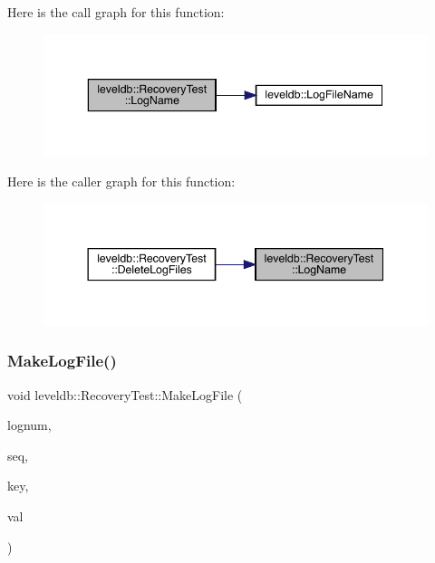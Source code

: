 Here is the call graph for this function\+:
\nopagebreak
\begin{figure}[H]
\begin{center}
\leavevmode
\includegraphics[width=343pt]{classleveldb_1_1_recovery_test_a1de129c9b097649c0c4349882e536d77_cgraph}
\end{center}
\end{figure}
Here is the caller graph for this function\+:
\nopagebreak
\begin{figure}[H]
\begin{center}
\leavevmode
\includegraphics[width=344pt]{classleveldb_1_1_recovery_test_a1de129c9b097649c0c4349882e536d77_icgraph}
\end{center}
\end{figure}
\mbox{\label{classleveldb_1_1_recovery_test_a361c575ee0f6531b95fb58878b1c69bf}} 
\subsubsection{\texorpdfstring{MakeLogFile()}{MakeLogFile()}}
{\footnotesize\ttfamily void leveldb\+::\+Recovery\+Test\+::\+Make\+Log\+File (\begin{DoxyParamCaption}\item[{uint64\+\_\+t}]{lognum,  }\item[{\mbox{\hyperlink{namespaceleveldb_a5481ededd221c36d652c371249f869fa}{Sequence\+Number}}}]{seq,  }\item[{\mbox{\hyperlink{classleveldb_1_1_slice}{Slice}}}]{key,  }\item[{\mbox{\hyperlink{classleveldb_1_1_slice}{Slice}}}]{val }\end{DoxyParamCaption})\hspace{0.3cm}{\ttfamily [inline]}}

